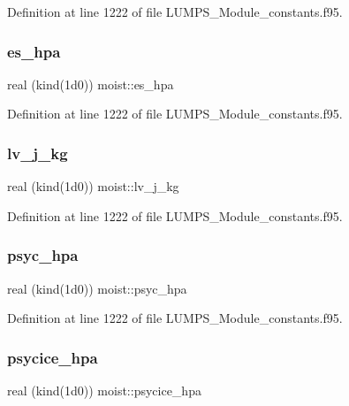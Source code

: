 Definition at line 1222 of file L\+U\+M\+P\+S\+\_\+\+Module\+\_\+constants.\+f95.

\mbox{\label{namespacemoist_a711adf6d19a4bb7b9a6c55d39dd5357b}} 
\subsubsection{\texorpdfstring{es\+\_\+hpa}{es\_hpa}}
{\footnotesize\ttfamily real (kind(1d0)) moist\+::es\+\_\+hpa}



Definition at line 1222 of file L\+U\+M\+P\+S\+\_\+\+Module\+\_\+constants.\+f95.

\mbox{\label{namespacemoist_a59a8f410cf3ebfe343d9c01b5dbb2cf8}} 
\subsubsection{\texorpdfstring{lv\+\_\+j\+\_\+kg}{lv\_j\_kg}}
{\footnotesize\ttfamily real (kind(1d0)) moist\+::lv\+\_\+j\+\_\+kg}



Definition at line 1222 of file L\+U\+M\+P\+S\+\_\+\+Module\+\_\+constants.\+f95.

\mbox{\label{namespacemoist_a8a8d0c665be356954056ed6c102b953b}} 
\subsubsection{\texorpdfstring{psyc\+\_\+hpa}{psyc\_hpa}}
{\footnotesize\ttfamily real (kind(1d0)) moist\+::psyc\+\_\+hpa}



Definition at line 1222 of file L\+U\+M\+P\+S\+\_\+\+Module\+\_\+constants.\+f95.

\mbox{\label{namespacemoist_a6c83d3efeb2f1e2423e18064a8935c6e}} 
\subsubsection{\texorpdfstring{psycice\+\_\+hpa}{psycice\_hpa}}
{\footnotesize\ttfamily real (kind(1d0)) moist\+::psycice\+\_\+hpa}



